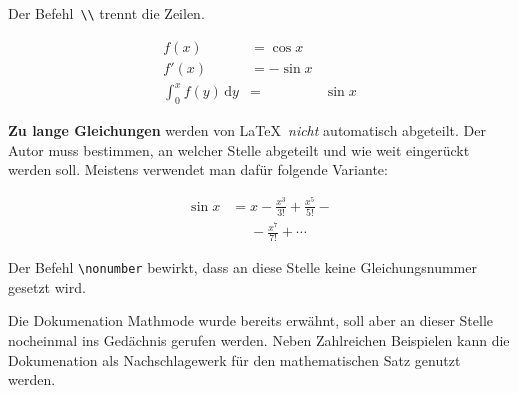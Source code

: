 Der Befehl~\lstinline|\\| trennt die Zeilen.

\begin{LTXexample}
\begin{align}
f(x) & =  \cos x       \\
f'(x) & =  -\sin x     \\
\int_{0}^{x} f(y)\,\mathrm{d}y &
 = & \sin x
\end{align}
\end{LTXexample}


 
\textbf{Zu lange Gleichungen} werden von \LaTeX\ \textit{nicht}
automatisch abgeteilt.
Der Autor muss bestimmen, an welcher Stelle abgeteilt und wie
weit eingerückt werden soll.
Meistens verwendet man dafür folgende Variante:

\begin{LTXexample}
\begin{align}
\sin x & =  x -\frac{x^{3}}{3!}
     +\frac{x^{5}}{5!} - {} 
                    \nonumber\\
 &\mathrel{\phantom{=}} 
  -\frac{x^{7}}{7!} + \cdots
\end{align}
\end{LTXexample}

Der Befehl \lstinline|\nonumber| bewirkt, dass an diese Stelle keine
Gleichungsnummer gesetzt wird.

Die Dokumenation Mathmode wurde bereits erwähnt, soll aber an dieser Stelle
nocheinmal ins Gedächnis gerufen werden. Neben Zahlreichen Beispielen kann
die Dokumenation als Nachschlagewerk für den mathematischen Satz genutzt werden.

\endinput
